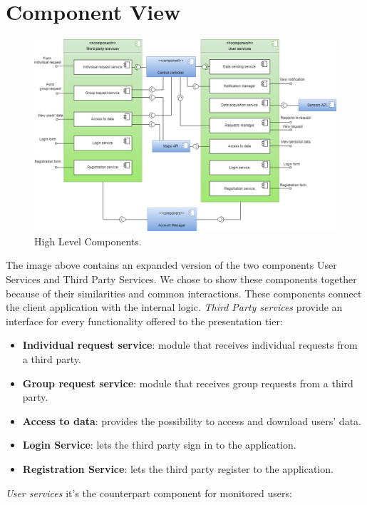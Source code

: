 \hypertarget{CV}{\section{Component	View}}
\begin{figure}[ht]
    \centering
    \includegraphics[width=345pt]{images/CompView/Component_view1.png}
    \caption{High Level Components.}
\end{figure}
\noindent The image above contains an expanded version of the two components User Services and Third Party Services.
We chose to show these components together because of their similarities and common interactions.
These components connect the client application with the internal logic.
\textit{Third Party services} provide an interface for every functionality offered to the presentation tier:
\begin{itemize}
    \item \textbf{Individual request service}: module that receives individual requests from a third party.
    \item \textbf{Group request service}: module that receives group requests from a third party.
    \item \textbf{Access to data}: provides the possibility to access and download users' data.
    \item \textbf{Login Service}: lets the third party sign in to the application.
    \item \textbf{Registration Service}: lets the third party register to the application.
\end{itemize}
\textit{User services} it's the counterpart component for monitored users:

